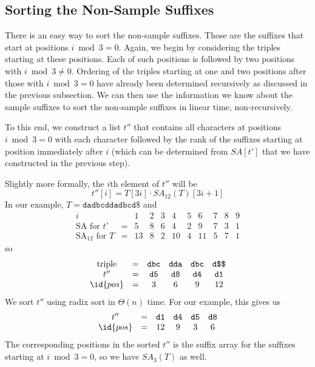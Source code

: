 \subsection{Sorting the Non-Sample Suffixes}

There is an easy way to sort the non-sample suffixes. Those are the suffixes that start at positions $i \bmod 3 = 0$. Again, we begin by considering the triples starting at these positions. Each of such positions is followed by two positions with $i \bmod 3 \neq 0$. Ordering of the triples starting at one and two positions after those with $i \bmod 3 = 0$ have already been determined recursively as discussed in the previous subsection. We can then use the information we know about the sample suffixes to sort the non-sample suffixes in linear time, non-recursively.

To this end, we construct a list $t''$ that contains all characters at positions $i \bmod 3 = 0$ with each character followed by the rank of the suffixes starting at position immediately after $i$ (which can be determined from $SA[t']$ that we have constructed in the previous step).

Slightly more formally, the $i$th element of $t''$ will be
$$
t''[i] = T[3i] \cdot SA_{12}(T)[3i+1]
$$
In our example, $T = \texttt{dadbcddadbcd\$}$ and
$$
\begin{array}{ccccccccccc}
    \scriptstyle i &  & \scriptstyle 1 & \scriptstyle 2 & \scriptstyle 3 & \scriptstyle 4 & \scriptstyle 5 & \scriptstyle 6 & \scriptstyle 7 & \scriptstyle 8 & \scriptstyle 9 \\
    \text{SA for $t'$} & = & 5 & 8 & 6 & 4 & 2 &  9 & 7 & 3 & 1 \\
    \text{SA$_{12}$ for $T$} & = & 13 & 8 & 2 & 10 & 4 & 11 & 5 & 7 & 1
\end{array}
$$
so
$$
\begin{array}{ccccccccccc}
    \text{triple} & = & \texttt{dbc} & \texttt{dda} & \texttt{dbc} & \texttt{d\$\$} \\
    t'' & = & \texttt{d5} & \texttt{d8} & \texttt{d4} & \texttt{d1} \\
    \id{pos} & = & 3 & 6 & 9 & 12
\end{array}
$$
We sort $t''$ using radix sort in $\Theta(n)$ time. For our example, this gives us
$$
\begin{array}{ccccccccccc}
    t'' & = & \texttt{d1} & \texttt{d4} & \texttt{d5} & \texttt{d8} \\
    \id{pos} & = & 12 & 9 & 3 & 6
\end{array}
$$
The corresponding positions in the sorted $t''$ is the suffix array for the suffixes starting at $i \bmod 3 = 0$, so we have $SA_{3}(T)$ as well.

